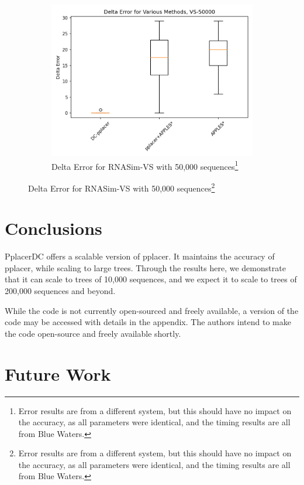 \documentclass[10pt]{article}
\begin{document}
\begin{figure}[!htb]
\begin{subfigure}{0.5\textwidth}
\includegraphics[width=\textwidth]{Figs/VS-delta-error-50000.png}
\caption{Delta Error for RNASim-VS with 50,000 sequences\footnote{Error results are from a different system, but this should have no impact on the accuracy, as all parameters were identical, and the timing results are all from Blue Waters.}}
\label{fig:error50000}
\end{subfigure}
\end{figure}

\section{Conclusions}

PplacerDC offers a scalable version of pplacer. It maintains the accuracy of pplacer, while scaling to large trees. Through the results here, we demonstrate that it can scale to trees of 10,000 sequences, and we expect it to scale to trees of 200,000 sequences and beyond.

While the code is not currently open-sourced and freely available, a version of the code
may be accessed with details in the appendix.
The authors intend to make the code open-source and freely available shortly.

\section{Future Work}
\end{document}
